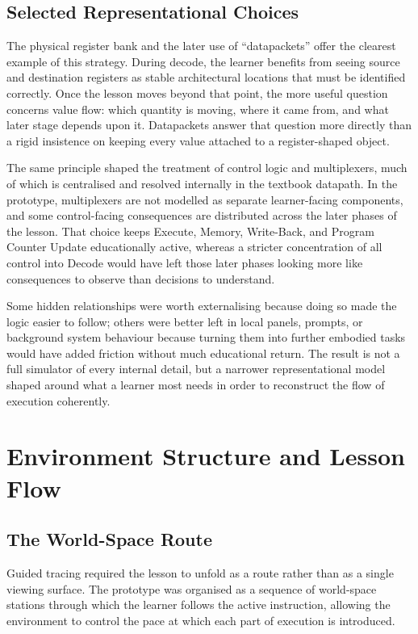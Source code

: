 \subsection{Selected Representational Choices}

The physical register bank and the later use of ``datapackets'' offer the clearest example of this strategy. During decode, the learner benefits from seeing source and destination registers as stable architectural locations that must be identified correctly. Once the lesson moves beyond that point, the more useful question concerns value flow: which quantity is moving, where it came from, and what later stage depends upon it. Datapackets answer that question more directly than a rigid insistence on keeping every value attached to a register-shaped object.

The same principle shaped the treatment of control logic and multiplexers, much of which is centralised and resolved internally in the textbook datapath. In the prototype, multiplexers are not modelled as separate learner-facing components, and some control-facing consequences are distributed across the later phases of the lesson. That choice keeps Execute, Memory, Write-Back, and Program Counter Update educationally active, whereas a stricter concentration of all control into Decode would have left those later phases looking more like consequences to observe than decisions to understand.

Some hidden relationships were worth externalising because doing so made the logic easier to follow; others were better left in local panels, prompts, or background system behaviour because turning them into further embodied tasks would have added friction without much educational return. The result is not a full simulator of every internal detail, but a narrower representational model shaped around what a learner most needs in order to reconstruct the flow of execution coherently.

\section{Environment Structure and Lesson Flow}

\subsection{The World-Space Route}

Guided tracing required the lesson to unfold as a route rather than as a single viewing surface. The prototype was organised as a sequence of world-space stations through which the learner follows the active instruction, allowing the environment to control the pace at which each part of execution is introduced.

